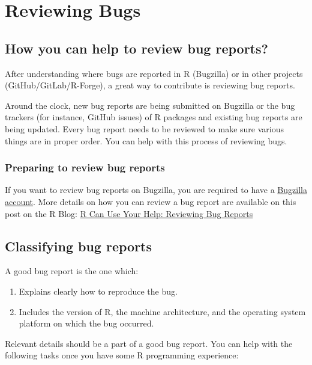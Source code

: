 \documentclass[
]{book}
\begin{document}
\chapter{Reviewing Bugs}\label{ReviewBugs}

\section{How you can help to review bug reports?}\label{how-you-can-help-to-review-bug-reports}

After understanding where bugs are reported in R (Bugzilla) or in other projects (GitHub/GitLab/R-Forge), a great way to contribute is reviewing bug reports.

Around the clock, new bug reports are being submitted on Bugzilla or the bug trackers (for instance, GitHub issues) of R packages and existing bug reports are being updated. Every bug report needs to be reviewed to make sure various things are in proper order. You can help with this process of reviewing bugs.

\subsection{Preparing to review bug reports}\label{preparing-to-review-bug-reports}

If you want to review bug reports on Bugzilla, you are required to have a \hyperref[bugzilla-account]{Bugzilla account}. More details on how you can review a bug report are available on this post on the R Blog: \href{https://blog.r-project.org/2019/10/09/r-can-use-your-help-reviewing-bug-reports/index.html}{R Can Use Your Help: Reviewing Bug Reports}

\section{Classifying bug reports}\label{classifying-bug-reports}

A good bug report is the one which:

\begin{enumerate}
\def\labelenumi{\arabic{enumi}.}
\item
  Explains clearly how to reproduce the bug.
\item
  Includes the version of R, the machine architecture, and the operating system platform on which the bug occurred.
\end{enumerate}

Relevant details should be a part of a good bug report. You can help with the following tasks once you have some R programming experience:
\end{document}
